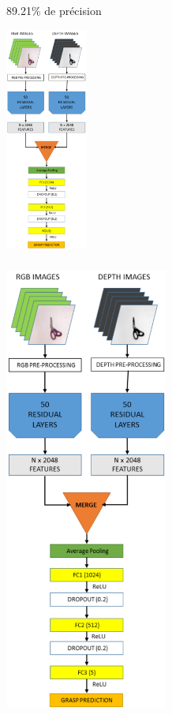\documentclass{beamer}
\begin{document}
\begin{frame}
  \frametitle{\cite{Kumra2016}}
  89.21\% de précision
  \begin{center}
  \includegraphics[width=0.2\textwidth]{img/resnet_grasp.png}
  \end{center}
\end{frame}

\begin{frame}
  \frametitle{\cite{Kumra2016}}
  \begin{center}
  \includegraphics[width=0.4\textwidth]{img/resnet_grasp.png}
  \end{center}
\end{frame}
\end{document}
